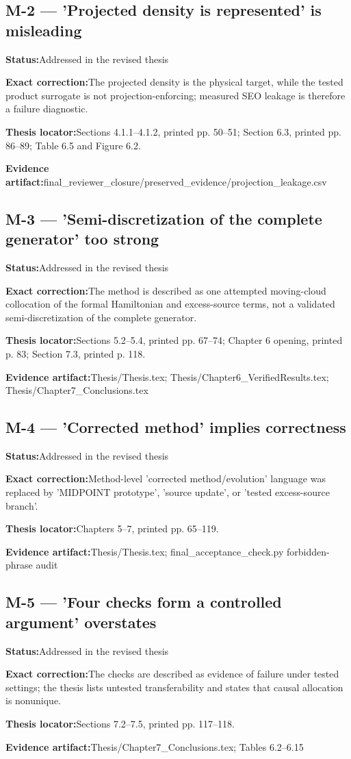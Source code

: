 \documentclass[11pt]{article}
\newcommand{\field}[2]{\textbf{#1}\quad #2\par}
\begin{document}
\subsection*{M-2 --- 'Projected density is represented' is misleading}
\field{Status:}{Addressed in the revised thesis}
\field{Exact correction:}{The projected density is the physical target, while the tested product surrogate is not projection-enforcing; measured SEO leakage is therefore a failure diagnostic.}
\field{Thesis locator:}{Sections 4.1.1--4.1.2, printed pp. 50--51; Section 6.3, printed pp. 86--89; Table 6.5 and Figure 6.2.}
\field{Evidence artifact:}{final\_reviewer\_closure/preserved\_evidence/projection\_leakage.csv}
\subsection*{M-3 --- 'Semi-discretization of the complete generator' too strong}
\field{Status:}{Addressed in the revised thesis}
\field{Exact correction:}{The method is described as one attempted moving-cloud collocation of the formal Hamiltonian and excess-source terms, not a validated semi-discretization of the complete generator.}
\field{Thesis locator:}{Sections 5.2--5.4, printed pp. 67--74; Chapter 6 opening, printed p. 83; Section 7.3, printed p. 118.}
\field{Evidence artifact:}{Thesis/Thesis.tex; Thesis/Chapter6\_VerifiedResults.tex; Thesis/Chapter7\_Conclusions.tex}
\subsection*{M-4 --- 'Corrected method' implies correctness}
\field{Status:}{Addressed in the revised thesis}
\field{Exact correction:}{Method-level 'corrected method/evolution' language was replaced by 'MIDPOINT prototype', 'source update', or 'tested excess-source branch'.}
\field{Thesis locator:}{Chapters 5--7, printed pp. 65--119.}
\field{Evidence artifact:}{Thesis/Thesis.tex; final\_acceptance\_check.py forbidden-phrase audit}
\subsection*{M-5 --- 'Four checks form a controlled argument' overstates}
\field{Status:}{Addressed in the revised thesis}
\field{Exact correction:}{The checks are described as evidence of failure under tested settings; the thesis lists untested transferability and states that causal allocation is nonunique.}
\field{Thesis locator:}{Sections 7.2--7.5, printed pp. 117--118.}
\field{Evidence artifact:}{Thesis/Chapter7\_Conclusions.tex; Tables 6.2--6.15}
\end{document}
